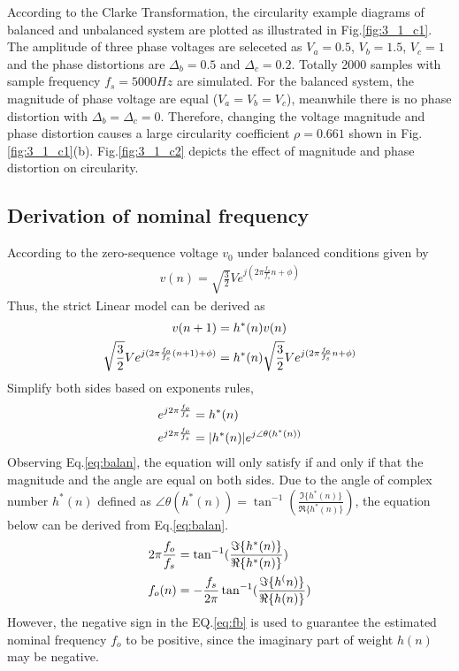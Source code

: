 \noindent
According to the Clarke Transformation, the circularity example diagrams of balanced and unbalanced system are plotted as illustrated in Fig.\ref{fig:3_1_c1}. The amplitude of three phase voltages are seleceted as $V_a=0.5$, $V_b=1.5$, $V_c=1$ and the phase distortions are $\Delta_b=0.5$ and $\Delta_c=0.2$. Totally 2000 samples with sample frequency $f_s=5000Hz$ are simulated. For the balanced system, the magnitude of phase voltage are equal ($V_a=V_b=V_c$), meanwhile there is no phase distortion with $\Delta_b=\Delta_c=0$. Therefore, changing the voltage magnitude and phase distortion causes a large circularity coefficient $\rho=0.661$ shown in Fig.\ref{fig:3_1_c1}(b). Fig.\ref{fig:3_1_c2} depicts the effect of magnitude and phase distortion on circularity.
\subsection{Derivation of nominal frequency}
According to the zero-sequence voltage $v_0$ under balanced conditions given by
\begin{align}
v(n)=\sqrt{\frac{3}{2}}Ve^{j(2\pi\frac{f_o}{f_s}n+\phi)}\label{eq:vol}
\end{align}
Thus, the strict Linear model can be derived as
\begin{align}
v(n+1)&=h^*(n)v(n)\notag\\
\sqrt{\frac{3}{2}}Ve^{j(2\pi\frac{f_o}{f_s}(n+1)+\phi)}&=h^*(n)\sqrt{\frac{3}{2}}Ve^{j(2\pi\frac{f_o}{f_s}n+\phi)}\notag\\
\end{align}
Simplify both sides based on exponents rules, 
\begin{align}
e^{j2\pi\frac{f_o}{f_s}}&=h^*(n)\notag\\
e^{j2\pi\frac{f_o}{f_s}}&=|h^*(n)|e^{j\angle{\theta(h^*(n))}}
\label{eq:balan}
\end{align}
Observing Eq.\ref{eq:balan}, the equation will only satisfy if and only if that the magnitude and the angle are equal on both sides. Due to the angle of complex number $h^*(n)$ defined as $\angle \theta(h^*(n)) =\tan^{-1}(\frac{\Im\{h^*(n)\}}{\Re\{h^*(n)\}})$, the equation below can be derived from Eq.\ref{eq:balan}.
\begin{align}
2\pi\frac{f_o}{f_s}&=\tan^{-1}(\frac{\Im\{h^*(n)\}}{\Re\{h^*(n)\}})\notag\\
f_o(n)&=-\frac{f_s}{2\pi}\tan^{-1}(\frac{\Im\{h^(n)\}}{\Re\{h(n)\}})
\label{eq:fb}
\end{align}
However, the negative sign in the EQ.\ref{eq:fb} is use{}d to guarantee the estimated nominal frequency $f_o$ to be positive, since the imaginary part of weight $h(n)$ may be negative.
